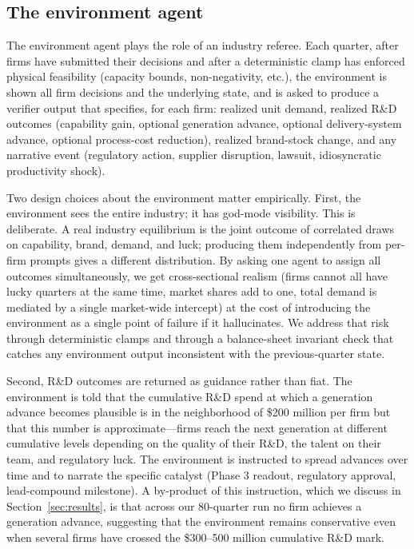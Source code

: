 \documentclass[11pt]{article}
\begin{document}
\subsection{The environment agent}\label{sec:envagent}

The environment agent plays the role of an industry referee. Each
quarter, after firms have submitted their decisions and after a
deterministic clamp has enforced physical feasibility (capacity bounds,
non-negativity, etc.), the environment is shown all firm decisions and
the underlying state, and is asked to produce a verifier output that
specifies, for each firm: realized unit demand, realized R\&D
outcomes (capability gain, optional generation advance, optional
delivery-system advance, optional process-cost reduction), realized
brand-stock change, and any narrative event (regulatory action, supplier
disruption, lawsuit, idiosyncratic productivity shock).

Two design choices about the environment matter empirically. First, the
environment sees the entire industry; it has god-mode visibility. This is
deliberate. A real industry equilibrium is the joint outcome of correlated
draws on capability, brand, demand, and luck; producing them
independently from per-firm prompts gives a different distribution. By
asking one agent to assign all outcomes simultaneously, we get
cross-sectional realism (firms cannot all have lucky quarters at the
same time, market shares add to one, total demand is mediated by a single
market-wide intercept) at the cost of introducing the environment as a
single point of failure if it hallucinates. We address that risk through
deterministic clamps and through a balance-sheet invariant check that
catches any environment output inconsistent with the previous-quarter
state.

Second, R\&D outcomes are returned as guidance rather than fiat. The
environment is told that the cumulative R\&D spend at which a generation
advance becomes plausible is in the neighborhood of \$200 million per
firm but that this number is approximate---firms reach the next
generation at different cumulative levels depending on the quality of
their R\&D, the talent on their team, and regulatory luck. The
environment is instructed to spread advances over time and to narrate the
specific catalyst (Phase 3 readout, regulatory approval,
lead-compound milestone). A by-product of this instruction, which we
discuss in Section~\ref{sec:results}, is that across our 80-quarter run
no firm achieves a generation advance, suggesting that the environment
remains conservative even when several firms have crossed the
\$300--500 million cumulative R\&D mark.
\end{document}
